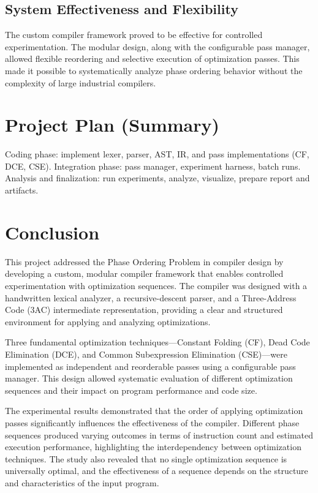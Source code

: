 \documentclass[conference]{IEEEtran}
\begin{document}
\subsection{System Effectiveness and Flexibility}
The custom compiler framework proved to be effective for controlled experimentation. The modular design, along with the configurable pass manager, allowed flexible reordering and selective execution of optimization passes. This made it possible to systematically analyze phase ordering behavior without the complexity of large industrial compilers.

\section{Project Plan (Summary)}
Coding phase: implement lexer, parser, AST, IR, and pass implementations (CF, DCE, CSE). Integration phase: pass manager, experiment harness, batch runs. Analysis and finalization: run experiments, analyze, visualize, prepare report and artifacts.

\section{Conclusion}
This project addressed the Phase Ordering Problem in compiler design by developing a custom, modular compiler framework that enables controlled experimentation with optimization sequences. The compiler was designed with a handwritten lexical analyzer, a recursive-descent parser, and a Three-Address Code (3AC) intermediate representation, providing a clear and structured environment for applying and analyzing optimizations.

Three fundamental optimization techniques—Constant Folding (CF), Dead Code Elimination (DCE), and Common Subexpression Elimination (CSE)—were implemented as independent and reorderable passes using a configurable pass manager. This design allowed systematic evaluation of different optimization sequences and their impact on program performance and code size.

The experimental results demonstrated that the order of applying optimization passes significantly influences the effectiveness of the compiler. Different phase sequences produced varying outcomes in terms of instruction count and estimated execution performance, highlighting the interdependency between optimization techniques. The study also revealed that no single optimization sequence is universally optimal, and the effectiveness of a sequence depends on the structure and characteristics of the input program.
\end{document}
